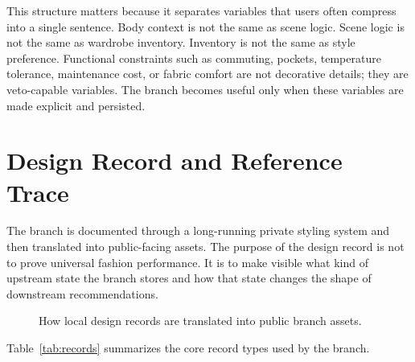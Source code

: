 \documentclass[11pt]{article}
\begin{document}
This structure matters because it separates variables that users often compress into a single sentence. Body context is not the same as scene logic. Scene logic is not the same as wardrobe inventory. Inventory is not the same as style preference. Functional constraints such as commuting, pockets, temperature tolerance, maintenance cost, or fabric comfort are not decorative details; they are veto-capable variables. The branch becomes useful only when these variables are made explicit and persisted.

\section{Design Record and Reference Trace}

The branch is documented through a long-running private styling system and then translated into public-facing assets. The purpose of the design record is not to prove universal fashion performance. It is to make visible what kind of upstream state the branch stores and how that state changes the shape of downstream recommendations.

\begin{figure}[htbp]
\centering
{}
\caption{How local design records are translated into public branch assets.}
\end{figure}

Table~\ref{tab:records} summarizes the core record types used by the branch.
\end{document}
